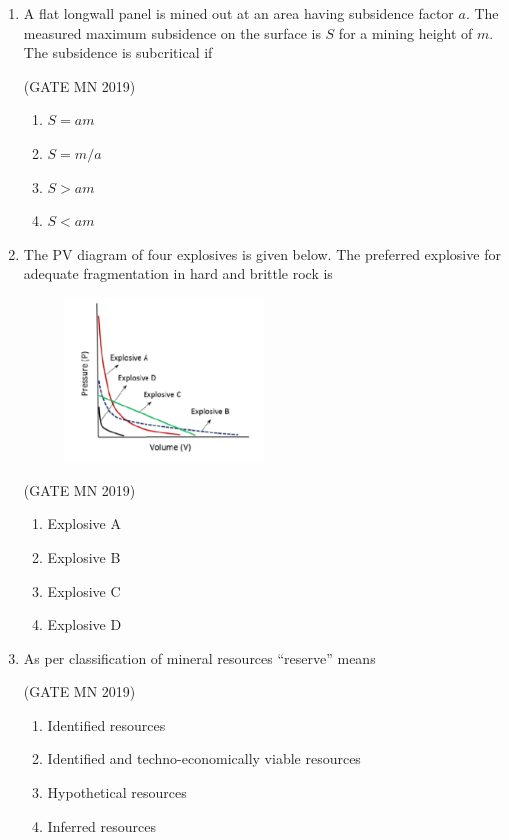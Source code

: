 \documentclass[journal]{IEEEtran}
\begin{document}
\begin{enumerate}
\item A flat longwall panel is mined out at an area having subsidence factor $a$. 
The measured maximum subsidence on the surface is $S$ for a mining height of $m$. 
The subsidence is subcritical if

\hfill(GATE MN 2019)
\begin{multicols}{4}
\begin{enumerate}
\item $S = am$
\item $S = m/a$
\item $S > am$
\item $S < am$
\end{enumerate}
\end{multicols}

\item The PV diagram of four explosives is given below. 
The preferred explosive for adequate fragmentation in hard and brittle rock is
\begin{figure}[H]                                
\centering
	\includegraphics[width=0.5\textwidth]{Screenshot_2025_0818_123801.png}
\caption{}      
\label{fig:Q14}          
\end{figure}


\hfill(GATE MN 2019)
\begin{multicols}{2}
\begin{enumerate}

\item Explosive A
\item Explosive B
\item Explosive C
\item Explosive D
\end{enumerate}
\end{multicols}


\item As per classification of mineral resources “reserve” means


	\hfill(GATE MN 2019)
\begin{enumerate}
\item Identified resources
\item Identified and techno-economically viable resources
\item Hypothetical resources
\item Inferred resources
\end{enumerate}



\end{enumerate}
\end{document}

